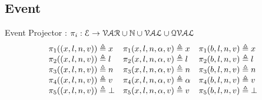 %
%
\subsection{Event}
%
Event Projector : $\pi_i : \mathcal{E} \to \mathcal{VAR} \cup \mathbb{N} \cup \mathcal{VAL} \cup \mathcal{QVAL}$
\[
\begin{array}{lll}
\pi_1((x, l, n, v)) \triangleq x
&
\pi_1 (x, l, n, \alpha, v) \triangleq x
&
\pi_1 (b, l, n, v)  \triangleq x
\\
\pi_2((x, l, n, v)) \triangleq l
&
\pi_2 (x, l, n, \alpha, v) \triangleq l
&
\pi_2 (b, l, n, v)  \triangleq l
\\
\pi_3((x, l, n, v)) \triangleq n
&
\pi_3 (x, l, n, \alpha, v) \triangleq n
&
\pi_3 (b, l, n, v)  \triangleq n
\\
\pi_4((x, l, n, v)) \triangleq v
&
\pi_4 (x, l, n, \alpha, v) \triangleq \alpha
&
\pi_4 (b, l, n, v)  \triangleq v
\\
\pi_5((x, l, n, v)) \triangleq \bot
&
\pi_5 (x, l, n, \alpha, v) \triangleq v
&
\pi_5 (b, l, n, v)  \triangleq \bot
\end{array}
\]
%

